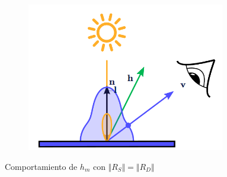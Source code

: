 \begin{figure}[!h]
\begin{subfigure}[b]{0.32\linewidth}
        \includegraphics[width=0.95\textwidth, align=b]{Plantilla-TFG-master/img/phong3.png}
     \end{subfigure}
     \caption{Comportamiento de  $h_m$ con $\Vert R_S\Vert =\Vert R_D\Vert$}
     \label{fig:phong}
\end{figure}

